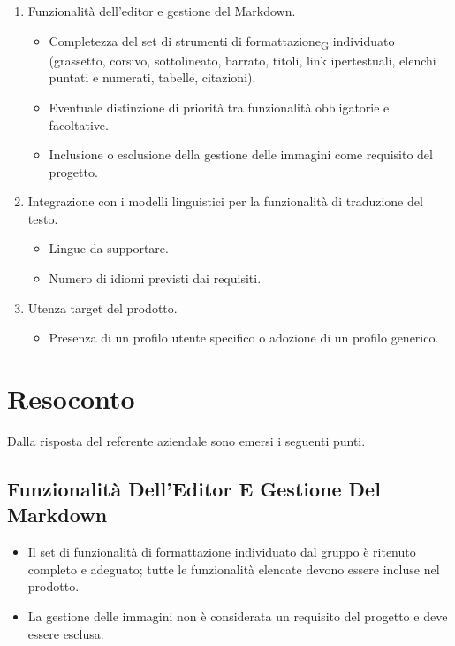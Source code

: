 \begin{enumerate}
	\item Funzionalità dell'editor e gestione del Markdown.
	\begin{itemize}
		\item Completezza del set di strumenti di formattazione\textsubscript{G} individuato
		      (grassetto, corsivo, sottolineato, barrato, titoli, link
		      ipertestuali, elenchi puntati e numerati, tabelle, citazioni).
		\item Eventuale distinzione di priorità tra funzionalità obbligatorie
		      e facoltative.
		\item Inclusione o esclusione della gestione delle immagini come
		      requisito del progetto.
	\end{itemize}
	\item Integrazione con i modelli linguistici per la funzionalità di
	      traduzione del testo.
	\begin{itemize}
		\item Lingue da supportare.
		\item Numero di idiomi previsti dai requisiti.
	\end{itemize}
	\item Utenza target del prodotto.
	\begin{itemize}
		\item Presenza di un profilo utente specifico o adozione di un
		      profilo generico.
	\end{itemize}
\end{enumerate}

\section{Resoconto}
Dalla risposta del referente aziendale sono emersi i seguenti punti.

\subsection{Funzionalità Dell'Editor E Gestione Del Markdown}
\begin{itemize}
	\item Il set di funzionalità di formattazione individuato dal gruppo
	      è ritenuto completo e adeguato; tutte le funzionalità elencate
	      devono essere incluse nel prodotto.
	\item La gestione delle immagini non è considerata un requisito del
	      progetto e deve essere esclusa.
\end{itemize}

